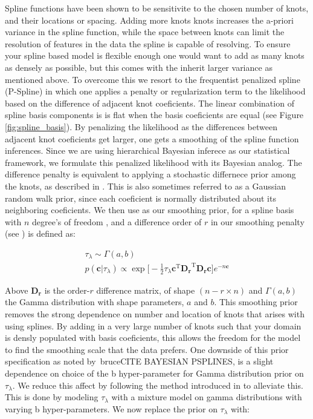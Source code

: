 Spline functions have been shown to be sensitivite to the chosen number of knots, and their locations or spacing. 
Adding more knots knots increases the a-priori variance in the spline function, while the space between knots can limit the 
resolution of features in the data the spline is capable of resolving. To ensure your spline based model is flexible enough 
one would want to add as many knots as densely as possible, but this comes with the inherit larger variance as mentioned above. 
To overcome this we resort to the frequentist penalized spline (P-Spline) in which one applies a penalty or regularization term 
to the likelihood based on the difference of adjacent knot coeficients. The linear combination of spline basis components is 
is flat when the basis coeficients are equal (see Figure \ref{fig:spline_basis}). By penalizing the likelihood as the differences between adjacent
knot coeficients get larger, one gets a smoothing of the spline function inferences. Since we are using hierarchical Bayesian inferece as our 
statistical framework, we formulate this penalized likelihood with its Bayesian analog. The difference penalty is equivalent to applying a stochastic 
differnece prior among the knots, as described in . This is also sometimes referred to as a Gaussian random walk prior, since
each coeficient is normally distributed about its neighboring coeficients. We then use as our smoothing prior, for a spline basis with $n$ degree's of freedom
, and a difference order of $r$ in our smoothing penalty (see ) is defined as:

\begin{eqnarray}
\tau_\lambda \sim \Gamma(a, b) \\
p(\bm{c} | \tau_\lambda) \propto \exp \big[ -\frac{1}{2} \tau_\lambda \bm{c}^{\mathrm{T}} \bm{D_r}^{\mathrm{T}} \bm{D_r} \bm{c}  \big] e^{-n\bm{c}}
\end{eqnarray}

\noindent Above $\bm{D_r}$ is the order-$r$ difference matrix, of shape $(n-r \times n)$ and $\Gamma(a,b)$ the Gamma distribution with shape parameters, $a$ and $b$. 
This smoothing prior removes the strong dependence on number and location of knots that arises with using splines. By adding in a very large number 
of knots such that your domain is densly populated with basis coeficients, this allows the freedom for the model to find the smoothing 
scale that the data prefers. One downside of this prior specification as noted by\ bruce{CITE BAYESIAN PSPLINES}, is a slight dependence on choice 
of the b hyper-parameter for Gamma distribution prior on $\tau_\lambda$. We reduce this affect by following the method introduced in  
to alleviate this. This is done by modeling $\tau_\lambda$ with a mixture model on gamma distributions with varying b hyper-parameters. 
We now replace the prior on $\tau_\lambda$ with:

